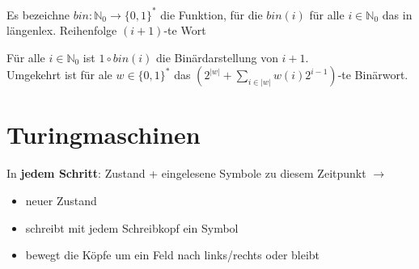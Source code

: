 \begin{bem}
    Es bezeichne $bin:\mathbb{N}_0 \rightarrow \{0,1\}^*$ die Funktion, für die $bin(i)$ für alle $i \in \mathbb{N}_0$ das in längenlex. Reihenfolge $(i+1)$-te Wort
\end{bem}

\begin{bem}
    Für alle $i \in \mathbb{N}_0$ ist $1 \circ bin(i)$ die Binärdarstellung von $i+1$. \\
    Umgekehrt ist für ale $w \in \{0,1\}^*$ das $(2^{|w|} + \sum_{i \in |w|}w(i)2^{i-1})$-te Binärwort.
\end{bem}

\section{Turingmaschinen}

In \textbf{jedem Schritt}: 
Zustand + eingelesene Symbole zu diesem Zeitpunkt $\rightarrow$
\begin{itemize}
    \item neuer Zustand
    \item schreibt mit jedem Schreibkopf ein Symbol
    \item bewegt die Köpfe um ein Feld nach links/rechts oder bleibt
\end{itemize}

